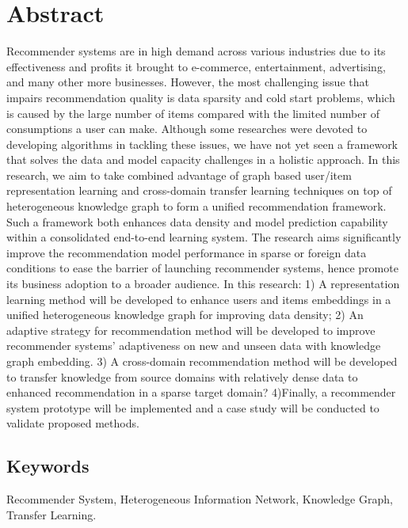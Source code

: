 \section*{Abstract}
Recommender systems are in high demand across various industries due to its effectiveness and profits it brought to e-commerce, entertainment, advertising, and many other more businesses. However, the most challenging issue that impairs recommendation quality is data sparsity and cold start problems, which is caused by the large number of items compared with the limited number of  consumptions a user can make. Although some researches were devoted to developing algorithms in tackling these issues, we have not yet seen a framework that solves the data and model capacity challenges in a holistic approach. In this research, we aim to take combined advantage of graph based user/item representation learning and cross-domain transfer learning techniques on top of heterogeneous knowledge graph to form a unified recommendation framework. Such a framework both enhances data density and model prediction capability within a consolidated end-to-end learning system. The research aims significantly improve the recommendation model performance in sparse or foreign data conditions to ease the barrier of launching recommender systems, hence promote its business adoption to a broader audience. In this research: 1) A representation learning method will be developed to enhance users and items embeddings in a unified heterogeneous knowledge graph for improving data density; 2) An adaptive strategy for recommendation method will be developed to improve recommender systems’ adaptiveness on new and unseen data with knowledge graph embedding. 3) A cross-domain recommendation method will be developed to transfer knowledge from source domains with relatively dense data to  enhanced recommendation in a sparse target domain? 4)Finally, a recommender system prototype will be implemented and a case study will be conducted to validate proposed methods. 

\subsection*{Keywords} 
Recommender System, Heterogeneous Information Network, Knowledge Graph, Transfer Learning.